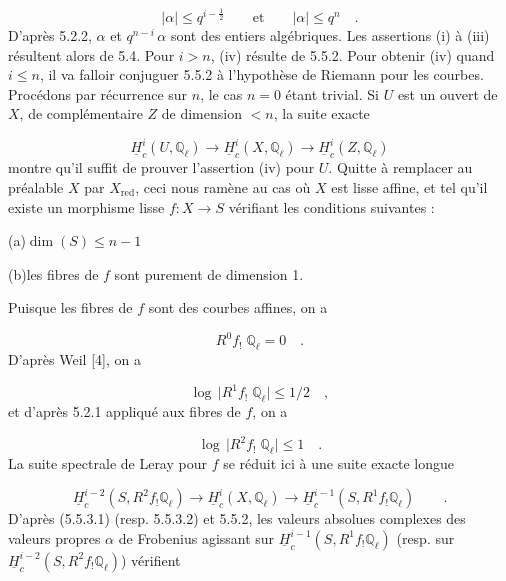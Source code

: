 \begin{equation*}
|\alpha| \leq q^{i-\frac{1}{2}} \qquad \mathrm{et} \qquad |\alpha| \leq q^n \quad .
\end{equation*}
D'après 5.2.2, $\alpha$ et $q^{n-i} \, \alpha$ sont des entiers algébriques. Les assertions (i) à (iii) résultent alors de 5.4. Pour $i > n$, (iv) résulte de 5.5.2. Pour obtenir (iv) quand $i \leq n$, il va falloir conjuguer 5.5.2 à l'hypothèse de Riemann pour les courbes. Procédons par récurrence sur $n$, le cas $n = 0$ étant trivial. Si $U$ est un ouvert de $X$, de complémentaire $Z$ de dimension $< n$, la suite exacte

\begin{equation*}
\underline{H}^i_c(U,\mathbb{Q}_\ell) \longrightarrow \underline{H}^i_c(X,\mathbb{Q}_\ell) \longrightarrow \underline{H}^i_c(Z,\mathbb{Q}_\ell)
\end{equation*}
montre qu'il suffit de prouver l'assertion (iv) pour $U$. Quitte à remplacer au préalable $X$ par $X_{\mathrm{red}}$, ceci nous ramène au cas où $X$ est lisse affine,
et tel qu'il existe un morphisme lisse $f : X \longrightarrow S$ vérifiant les conditions suivantes :

(a)\quad $\dim(S) \leq n-1$

(b)\quad les fibres de $f$ sont purement de dimension 1.

Puisque les fibres de $f$ sont des courbes affines, on a

\begin{equation*}
R^0 f_! \; \mathbb{Q}_\ell = 0 \quad .
\end{equation*}
D'après Weil [4], on a

\begin{equation}\tag{5.5.3.1}
\log \, \bigl| R^1 f_! \; \mathbb{Q}_\ell \bigr| \leq 1/2 \quad ,
\end{equation}
et d'après 5.2.1 appliqué aux fibres de $f$, on a

\begin{equation}\tag{5.5.3.2}
\log \, \bigl| R^2 f_! \; \mathbb{Q}_\ell \bigr| \leq 1 \quad .
\end{equation}
La suite spectrale de Leray pour $f$ se réduit ici à une suite exacte longue

\begin{equation*}
\underline{H}^{i-2}_c(S,R^2 f_! \mathbb{Q}_\ell) \longrightarrow \underline{H}^i_c(X,\mathbb{Q}_\ell) \longrightarrow \underline{H}^{i-1}_c(S,R^1 f_! \mathbb{Q}_\ell) \qquad .
\end{equation*}
D'après (5.5.3.1) (resp. 5.5.3.2) et 5.5.2, les valeurs absolues complexes des valeurs propres $\alpha$ de Frobenius agissant sur $\underline{H}^{i-1}_c(S,R^1 f_! \mathbb{Q}_\ell)$ (resp. sur $\underline{H}^{i-2}_c(S,R^2 f_! \mathbb{Q}_\ell)$) vérifient

